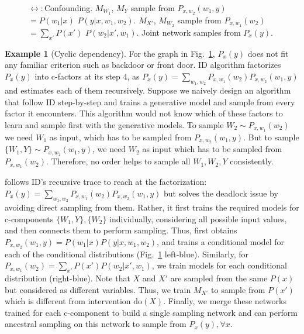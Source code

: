 \documentclass{article}
\newcommand{\Do}{\text{do}}
\newcommand{\idgen}{\text{ID-GEN}\xspace}
\theoremstyle{plain}
\theoremstyle{definition}
\newtheorem{example}[theorem]{Example}
\theoremstyle{remark}
\begin{document}
\begin{figure}[H]
\begin{subfigure}[c]{0.3\linewidth}
\end{subfigure}
	\caption{ 
 $\leftrightarrow:$Confounding.
 $M_{W_1}$, $M_Y$ sample from $P_{x,w_2}(w_1,y) $ $= P(w_1|x)$ $P(y|x,w_1,w_2)$. $M_{X'}$, $M_{W_2}$ sample from $P_{x, w_1}(w_2)$ $= \sum_{x'} P(x')$ $P(w_2|x',w_1)$. Joint network samples from $P_x(y)$. }
 \label{fig:cyclic}
\end{figure}

\begin{example}[Cyclic dependency]
\label{ex:cyclic}
For the graph in Fig.~\ref{fig:cyclic}, $P_{x}(y)$ does not fit any familiar criterion such as backdoor or front door.
ID algorithm factorizes $P_{x}(y)$ into c-factors at its step 4, as $ P_{x}(y)= \sum_{w_1,w_2} P_{x,w_1}(w_2)  P_{x,w_2}(w_1,y)$ 
and estimates each of them recursively. 
Suppose we naively design an algorithm that follow ID 
step-by-step and trains a generative model and sample from every factor it encounters.
This algorithm would not know which of these factors to learn and sample first with the generative models. To sample $W_2 \sim P_{x,w_1}(w_2)$ we need $W_1$ as input, which has to be sampled from $P_{x,w_2}(w_1,y)$. But to sample $\{W_1, Y\} \sim P_{x,w_2}(w_1,y)$, we need $W_2$ as input which has to be sampled from $P_{x,w_1}(w_2)$. Therefore, no order helps to sample all $W_1, W_2,Y$ consistently. 

 \idgen follows ID's recursive trace to reach at the factorization: $ P_{x}(y)= \sum_{w_1,w_2} P_{x,w_1}(w_2)  P_{x,w_2}(w_1,y)$  but solves the deadlock issue by avoiding direct sampling from them. 
		Rather, it first trains the required models for c-components $\{W_1,Y\},\{W_2\}$ individually, considering all possible input values, and then connects them to perform sampling.
Thus, \idgen first obtains $P_{x,w_2}(w_1,y) = P(w_1|x)P(y|x,w_1,w_2)$, and trains a conditional model for each of the conditional distributions (Fig.~\ref{fig:cyclic} left-blue). Similarly, for $P_{x, w_1}(w_2) = \sum_{x'}P(x')P(w_2|x', w_1)$, we train models for each conditional distribution (right-blue). 
Note that $X$ and $X'$ are sampled from the same $P(x)$ but considered as different variables. Thus, we train $M_{X'}$ to sample from $P(x')$ which is different from intervention $\Do(X)$.
  Finally, we merge these networks trained for each c-component to build a single sampling network and can perform ancestral sampling on this network to sample from $P_{x}(y), \forall x$.
\end{example}
\end{document}
